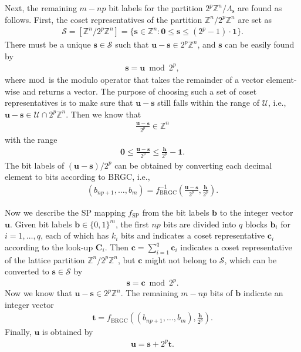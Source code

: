 \documentclass[journal]{IEEEtran}
\newcommand{\Z}{\mathbb{Z}}
\newcommand{\U}{\mathcal{U}}
\newcommand{\bb}{\boldsymbol{b}}
\newcommand{\bc}{\boldsymbol{c}}
\newcommand{\bh}{\boldsymbol{h}}
\newcommand{\bs}{\boldsymbol{s}}
\newcommand{\bt}{\boldsymbol{t}}
\newcommand{\bu}{\boldsymbol{u}}
\newcommand{\bC}{\boldsymbol{C}}
\newcommand{\bzero}{\boldsymbol{0}}
\newcommand{\bone}{\boldsymbol{1}}
\newcommand{\Lambdas}{\Lambda_\mathrm{s}}
\begin{document}
Next, the remaining $m-np$ bit labels for the partition $2^p\Z^n/\Lambdas$ are found as follows. First, the coset representatives of the partition $\Z^n/2^p\Z^n$ are set as 
\begin{align}
    \mathcal{S}=[\Z^n/2^p\Z^n]=\{\bs\in\Z^n:\bzero \leq \bs \leq (2^p-1) \cdot \bone\}.\label{eq:SP_coset}
\end{align} 
There must be a unique $\bs\in\mathcal{S}$ such that $\bu-\bs\in 2^p\Z^n$, and $\bs$ can be easily found by 
\begin{align}
    \bs=\bu \bmod 2^p,
\end{align}
where $\bmod$ is the modulo operator that takes the remainder of a vector element-wise and returns a vector. The purpose of choosing such a set of coset representatives is to make sure that $\bu-\bs$ still falls within the range of $\U$, i.e., $\bu-\bs \in \U \cap 2^p\Z^n$. Then we know that
\begin{align}
    \frac{\bu-\bs}{2^p} \in \Z^n
\end{align}
with the range
\begin{align}
    \bzero\leq\frac{\bu-\bs}{2^p}\leq \frac{\bh}{2^p}-\bone.
\end{align}
The bit labels of $(\bu-\bs)/2^p$ can be obtained by converting each decimal element to bits according to BRGC, i.e.,
\begin{align}\label{eq:leftbitsBRGC}
(b_{np+1},\dots,b_m)=f^{-1}_{\text{BRGC}}\left(\frac{\bu-\bs}{2^p},\frac{\bh}{2^p}\right).
\end{align}

Now we describe the SP mapping $f_{\text{SP}}$ from the bit labels $\bb$ to the integer vector $\bu$. Given bit labels $\bb\in\{0,1\}^m$, the first $np$ bits are divided into $q$ blocks $\bb_i$ for $i=1,\ldots,q$, each of which has $k_i$ bits and indicates a coset representative $\bc_i$ according to the look-up $\bC_i$. Then $\bc=\sum_{i=1}^q \bc_i$ indicates a coset representative of the lattice partition $\Z^n/2^p\Z^n$, but $\bc$ might not belong to $\mathcal{S}$, which can be converted to $\bs\in \mathcal{S}$ by
\begin{align}
    \bs=\bc \bmod 2^p.
\end{align}
Now we know that $\bu-\bs\in2^p\Z^n$. The remaining $m-np$ bits of $\bb$ indicate an integer vector
\begin{align}\label{eq:t}
 \bt= f_{\text{BRGC}}\left((b_{np+1},\dots,b_m),\frac{\bh}{2^p}\right).
\end{align}
Finally, $\bu$ is obtained by
\begin{align}\label{eq:u}
    \bu=\bs+2^p\bt.
\end{align}
\end{document}
